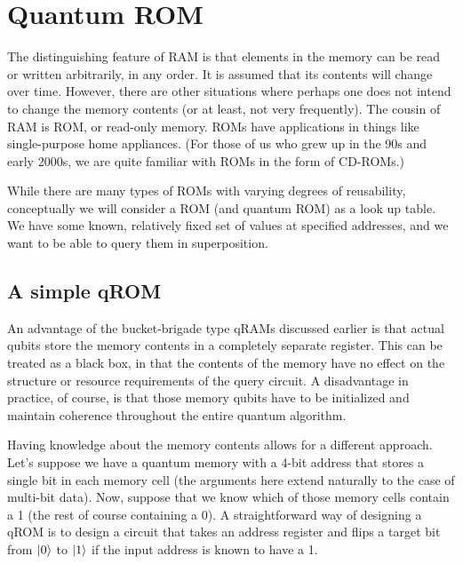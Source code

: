 \documentclass[a4paper,12pt]{article}
\begin{document}
\section{Quantum ROM}
\label{sec:qrom}

The distinguishing feature of RAM is that elements in the memory can be read or written arbitrarily, in any order. It is assumed that its contents will change over time. However, there are other situations where perhaps one does not intend to change the memory contents (or at least, not very frequently). The cousin of RAM is ROM, or read-only memory. ROMs have applications in things like single-purpose home appliances. (For those of us who grew up in the 90s and early 2000s, we are quite familiar with ROMs in the form of CD-ROMs.)

While there are many types of ROMs with varying degrees of reusability, conceptually we will consider a ROM (and quantum ROM) as a look up table. We have some known, relatively fixed set of values at specified addresses, and we want to be able to query them in superposition.

\subsection{A simple qROM}

An advantage of the bucket-brigade type qRAMs discussed earlier is that actual qubits store the memory contents in a completely separate register. This can be treated as a black box, in that the contents of the memory have no effect on the structure or resource requirements of the query circuit. A disadvantage in practice, of course, is that those memory qubits have to be initialized and maintain coherence throughout the entire quantum algorithm.

Having knowledge about the memory contents allows for a different approach. Let's suppose we have a quantum memory with a 4-bit address that stores a single bit in each memory cell (the arguments here extend naturally to the case of multi-bit data). Now, suppose that we know which of those memory cells contain a 1 (the rest of course containing a 0). A straightforward way of designing a qROM is to design a circuit that takes an address register and flips a target bit from $\ket{0}$ to $\ket{1}$ if the input address is known to have a 1.
\end{document}

